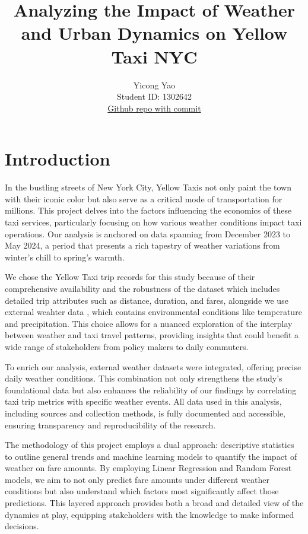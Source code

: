 \documentclass[11pt]{article}
\title{\textbf{Analyzing the Impact of Weather and Urban Dynamics on Yellow Taxi NYC}}
\author{
Yicong Yao \\
Student ID: 1302642 \\
\href{https://github.com/MAST30034-AppliedDataScience/project-1-individual-YicongYao.git}{Github repo with commit}
}
\begin{document}
\maketitle

\section{Introduction}


In the bustling streets of New York City, Yellow Taxis not only paint the town with their iconic color but also serve as a critical mode of transportation for millions. This project delves into the factors influencing the economics of these taxi services, particularly focusing on how various weather conditions impact taxi operations. Our analysis is anchored on data spanning from December 2023 to May 2024, a period that presents a rich tapestry of weather variations from winter's chill to spring's warmth.

We chose the Yellow Taxi trip records \cite{NYCdata} for this study because of their comprehensive availability and the robustness of the dataset which includes detailed trip attributes such as distance, duration, and fares, alongside we use external weahter data \cite{Weatherdata}, which contains environmental conditions like temperature and precipitation. This choice allows for a nuanced exploration of the interplay between weather and taxi travel patterns, providing insights that could benefit a wide range of stakeholders from policy makers to daily commuters.

To enrich our analysis, external weather datasets were integrated, offering precise daily weather conditions. This combination not only strengthens the study's foundational data but also enhances the reliability of our findings by correlating taxi trip metrics with specific weather events. All data used in this analysis, including sources and collection methods, is fully documented and accessible, ensuring transparency and reproducibility of the research.

The methodology of this project employs a dual approach: descriptive statistics to outline general trends and machine learning models to quantify the impact of weather on fare amounts. By employing Linear Regression and Random Forest models, we aim to not only predict fare amounts under different weather conditions but also understand which factors most significantly affect those predictions. This layered approach provides both a broad and detailed view of the dynamics at play, equipping stakeholders with the knowledge to make informed decisions. \cite{nyctaxi2016}
\end{document}
